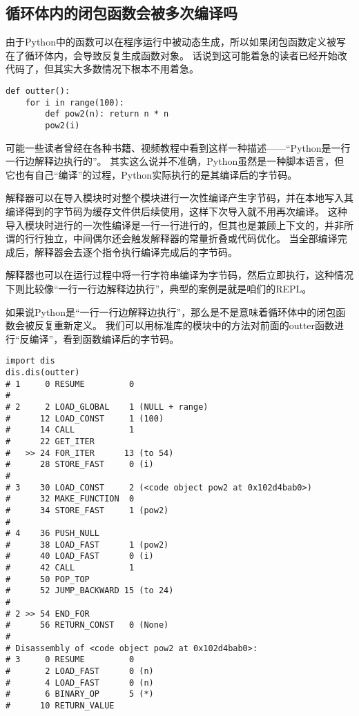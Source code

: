 \documentclass{ctexbook}
\begin{document}
\subsection{循环体内的闭包函数会被多次编译吗}

由于Python中的函数可以在程序运行中被动态生成，所以如果闭包函数定义被写在了循环体内，会导致反复生成函数对象。
话说到这可能着急的读者已经开始改代码了，但其实大多数情况下根本不用着急。

\begin{verbatim}
def outter():
    for i in range(100):
        def pow2(n): return n * n
        pow2(i)
\end{verbatim}

可能一些读者曾经在各种书籍、视频教程中看到这样一种描述——``Python是一行一行边解释边执行的''。
其实这么说并不准确，Python虽然是一种脚本语言，但它也有自己``编译''的过程，Python实际执行的是其编译后的字节码。

解释器可以在导入模块时对整个模块进行一次性编译产生字节码，并在本地写入其编译得到的字节码为缓存文件供后续使用，这样下次导入就不用再次编译。
这种导入模块时进行的一次性编译是一行一行进行的，但其也是兼顾上下文的，并非所谓的行行独立，中间偶尔还会触发解释器的常量折叠或代码优化。
当全部编译完成后，解释器会去逐个指令执行编译完成后的字节码。

解释器也可以在运行过程中将一行字符串编译为字节码，然后立即执行，这种情况下则比较像``一行一行边解释边执行''，典型的案例是就是咱们的REPL。

如果说Python是``一行一行边解释边执行''，那么是不是意味着循环体中的闭包函数会被反复重新定义。
我们可以用标准库的模块中的方法对前面的outter函数进行``反编译''，看到函数编译后的字节码。

\begin{verbatim}
import dis
dis.dis(outter)
# 1     0 RESUME         0
# 
# 2     2 LOAD_GLOBAL    1 (NULL + range)
#      12 LOAD_CONST     1 (100)
#      14 CALL           1
#      22 GET_ITER
#   >> 24 FOR_ITER      13 (to 54)
#      28 STORE_FAST     0 (i)
# 
# 3    30 LOAD_CONST     2 (<code object pow2 at 0x102d4bab0>)
#      32 MAKE_FUNCTION  0
#      34 STORE_FAST     1 (pow2)
# 
# 4    36 PUSH_NULL
#      38 LOAD_FAST      1 (pow2)
#      40 LOAD_FAST      0 (i)
#      42 CALL           1
#      50 POP_TOP
#      52 JUMP_BACKWARD 15 (to 24)
# 
# 2 >> 54 END_FOR
#      56 RETURN_CONST   0 (None)
# 
# Disassembly of <code object pow2 at 0x102d4bab0>:
# 3     0 RESUME         0
#       2 LOAD_FAST      0 (n)
#       4 LOAD_FAST      0 (n)
#       6 BINARY_OP      5 (*)
#      10 RETURN_VALUE
\end{verbatim}
\end{document}
